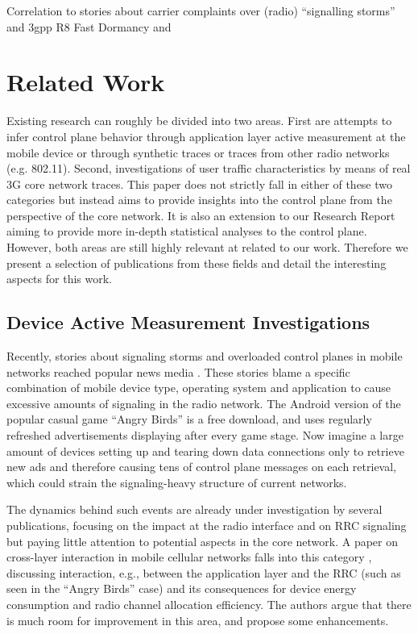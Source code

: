 Correlation to stories about carrier complaints over (radio) ``signalling storms''  and 3gpp R8 Fast Dormancy \cite{3gpp.25.331} and \cite{gsma2011fdbestpract}


\section{Related Work}
Existing research can roughly be divided into two areas. First are attempts to infer control plane behavior through application layer active measurement at the mobile device or through synthetic traces or traces from other radio networks (e.g. 802.11).
Second, investigations of user traffic characteristics by means of real 3G core network traces.
This paper does not strictly fall in either of these two categories but instead aims to provide insights into the control plane from the perspective of the core network. It is also an extension to our Research Report\cite{metzger2012research} aiming to provide more in-depth statistical analyses to the control plane.  
However, both areas are still highly relevant at related to our work. Therefore we present a selection of publications from these fields and detail the interesting aspects for this work.



\subsection{Device Active Measurement Investigations}

Recently, stories about signaling storms and overloaded control planes in mobile networks reached popular news media \cite{it2011birdandroid, lt2012docostorm}. These stories blame a specific combination of mobile device type, operating system and application to cause excessive amounts of signaling in the radio network. The Android version of the popular casual game ``Angry Birds'' is a free download, and uses regularly refreshed advertisements displaying after every game stage. Now imagine a large amount of devices setting up and tearing down data connections only to retrieve new ads and therefore causing tens of control plane messages on each retrieval, which could strain the signaling-heavy structure of current networks. 

The dynamics behind such events are already under investigation by several publications, focusing on the impact at the radio interface and on \gls{RRC} signaling but paying little attention to potential aspects in the core network. A paper on cross-layer interaction in mobile cellular networks falls into this category \cite{qian2011profiling}, discussing interaction, e.g., between the application layer and the \gls{RRC} (such as seen in the ``Angry Birds'' case) and its consequences for device energy consumption and radio channel allocation efficiency. The authors argue that there is much room for improvement in this area, and propose some enhancements.


